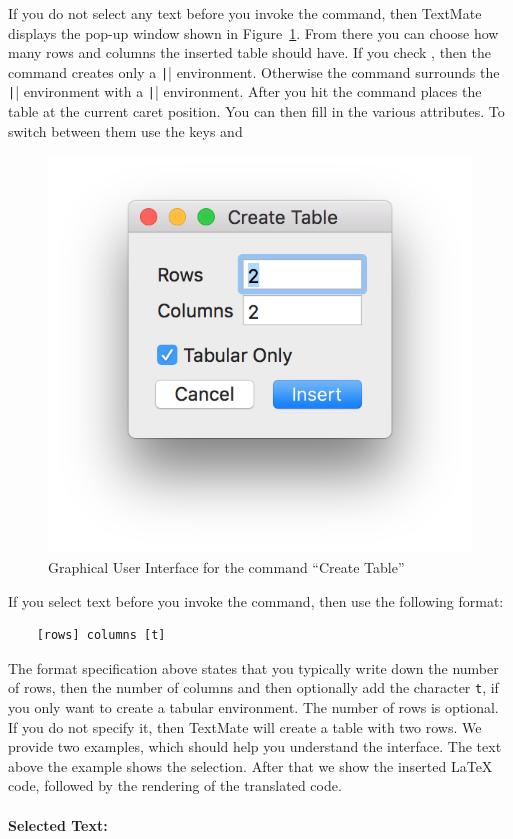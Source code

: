 \documentclass[11pt, x11names]{article}
\begin{document}
If you do not select any text before you invoke the command, then TextMate displays the pop-up window shown in Figure~\ref{fig:Figures_Table_-_Create_Table}. From there you can choose how many rows and columns the inserted table should have. If you check , then the command creates only a \texttt|\tabular| environment. Otherwise the command surrounds the \texttt|\tabular| environment with a \texttt|\table| environment. After you hit  the command places the table at the current caret position. You can then fill in the various attributes. To switch between them use the keys \keys{\tab} and \keys{\shift + \tab}

\begin{figure}[H]
  \centering
    \includegraphics[width=.5\textwidth]{Figures/Table - Create Table.png}
  \caption{Graphical User Interface for the command “Create Table”}
  \label{fig:Figures_Table_-_Create_Table}
\end{figure}

If you select text before you invoke the command, then use the following format:

\begin{verbatim}
    [rows] columns [t]
\end{verbatim}

The format specification above states that you typically write down the number of rows, then the number of columns and then optionally add the character \texttt{t}, if you only want to create a tabular environment. The number of rows is optional. If you do not specify it, then TextMate will create a table with two rows. We provide two examples, which should help you understand the interface. The text above the example shows the selection. After that we show the inserted LaTeX code, followed by the rendering of the translated code.

\paragraph{Selected Text: }
\end{document}
